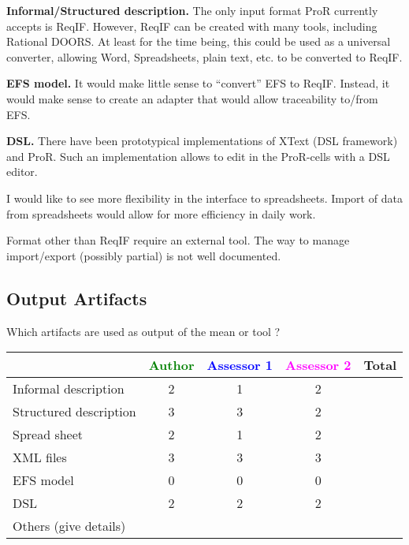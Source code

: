 \begin{author_comment}

\textbf{Informal/Structured description.} The only input format ProR currently accepts is ReqIF.  However, ReqIF can be created with many tools, including Rational DOORS.  At least for the time being, this could be used as a universal converter, allowing Word, Spreadsheets, plain text, etc. to be converted to ReqIF.

\textbf{EFS model.} It would make little sense to ``convert'' EFS to ReqIF.  Instead, it would make sense to create an adapter that would allow traceability to/from EFS.

\textbf{DSL.} There have been prototypical implementations of XText (DSL framework) and ProR.  Such an implementation allows to edit in the ProR-cells with a DSL editor.
\end{author_comment}

\begin{assessor1}
I would like to see more flexibility in the interface to spreadsheets. Import of data from spreadsheets would allow for more efficiency in daily work. 
\end{assessor1}

\begin{assessor2}
Format other than ReqIF require an external tool. The way to manage import/export (possibly partial) is not well documented.
\end{assessor2}

\subsection{Output Artifacts}

Which artifacts are used as output of the mean or tool  ?


\begin{tabular}{|l | c | c | c | c|}
\hline
& \textcolor{green}{Author} & \textcolor{blue}{Assessor 1} & \textcolor{magenta}{Assessor 2} & Total \\
\hline
Informal description & 2 & 1 & 2 &  \\
\hline
Structured description & 3 & 3 & 2 & \\
\hline
Spread sheet & 2 & 1 & 2 & \\
\hline
XML files & 3 & 3 & 3 & \\
\hline
EFS model & 0 & 0 & 0 & \\
\hline
DSL & 2 & 2 & 2 & \\
\hline
Others (give details) & & & & \\
\hline
\end{tabular}

